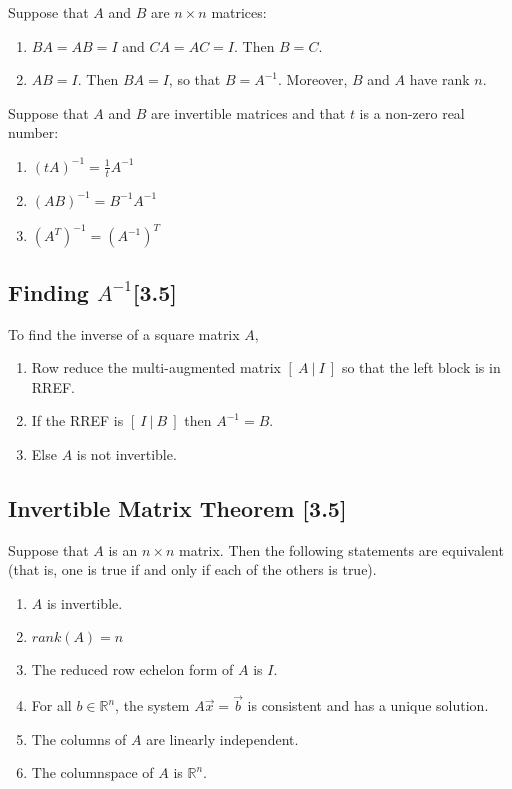 \documentclass[a4paper,9pt]{extarticle}
\begin{document}
\begin{multicols*}{2}
\noindent Suppose that $A$ and $B$ are $n \times n$ matrices:
\begin{enumerate}[label=\bfseries (\arabic*)] \itemsep0pt \parskip0pt 
    \item $BA = AB = I$ and $CA = AC = I$. Then $B = C$.
    \item $AB = I$. Then $BA = I$, so that $B = A^{-1}$. Moreover, $B$ and $A$ have rank $n$.
\end{enumerate}

\noindent Suppose that $A$ and $B$ are invertible matrices and that $t$ is a non-zero real number:
\begin{enumerate}[label=\bfseries (\arabic*)] \itemsep0pt \parskip0pt 
    \item $(tA)^{-1} = \frac{1}{t} A^{-1}$
    \item $(AB)^{-1} = B^{-1} A^{-1}$
    \item $(A^T)^{-1} = (A^{-1})^T$
\end{enumerate}


\subsection{Finding $A^{-1}$[3.5]}
To find the inverse of a square matrix $A$,
\begin{enumerate}[label=\bfseries (\arabic*)] \itemsep0pt \parskip0pt 
    \item Row reduce the multi-augmented matrix $[ \> A \> | \> I \> ]$ so that the left block is in RREF.
    \item If the RREF is $[ \> I \> | \> B \> ]$ then $A^{-1} = B$.
    \item Else $A$ is not invertible.
\end{enumerate}


\subsection{Invertible Matrix Theorem [3.5]}
Suppose that $A$ is an $n \times n$ matrix. Then the following statements are equivalent (that is, one is true if and only if each of the others is true).

\begin{enumerate}[label=\bfseries (\arabic*)] \itemsep0pt \parskip0pt 
    \item $A$ is invertible.
    \item $rank(A) = n$
    \item The reduced row echelon form of $A$ is $I$.
    \item For all $b \in \mathbb{R}^n$, the system $A \vec{x} = \vec{b}$ is consistent and has a unique solution.
    \item The columns of $A$ are linearly independent.
    \item The columnspace of $A$ is $\mathbb{R}^n$.
\end{enumerate}


\end{multicols*}
\end{document}
